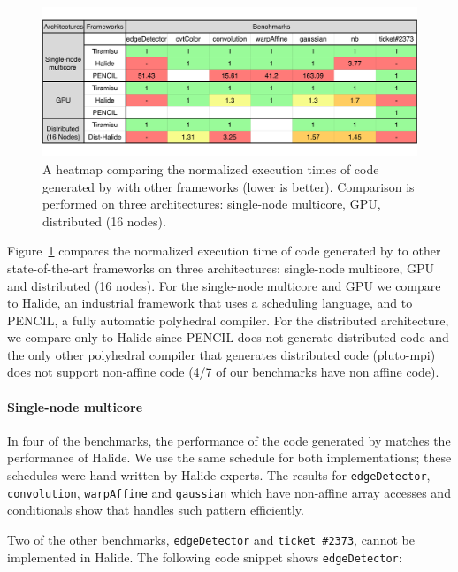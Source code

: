 \begin{figure}[t]
\centering
\includegraphics[width=1.05\columnwidth,trim=50 10 10 10]{./figures/tiramisu_heatmap.pdf}
\vspace{-0.5cm}
\caption{A heatmap comparing the normalized execution times of code generated by \framework{} with other frameworks (lower is better).  Comparison is performed on three architectures: single-node multicore, GPU, distributed (16 nodes).}
\label{fig:speedup}

\end{figure}

Figure~\ref{fig:speedup} compares the normalized execution time of code generated by \framework{} to other state-of-the-art frameworks on three architectures: single-node multicore, GPU and distributed (16 nodes).  For the single-node multicore and GPU we compare \framework{} to Halide, an industrial framework that uses a scheduling language, and to PENCIL, a fully automatic polyhedral compiler.  For the distributed architecture, we compare only to Halide since PENCIL does not generate distributed code and the only other polyhedral compiler that generates distributed code (pluto-mpi) does not support non-affine code (4/7 of our benchmarks have non affine code).

\paragraph{Single-node multicore}
In four of the benchmarks, the performance of the code generated by \framework{} matches the performance of Halide.  We use the same schedule for both implementations; these schedules were hand-written by Halide experts.  The results for \texttt{edgeDetector}, \texttt{convolution}, \texttt{warpAffine} and \texttt{gaussian} which have non-affine array accesses and conditionals show that \framework{} handles such pattern efficiently.

Two of the other benchmarks, \texttt{edgeDetector} and \texttt{ticket \#2373}, cannot be implemented in Halide.  The following code snippet shows \texttt{edgeDetector}:

